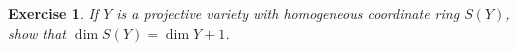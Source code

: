 \documentclass[12pt,letterpaper]{article}
\newtheorem{problem}{Exercise}[section]
\newtheorem{lemma}{Lemma}%
\theoremstyle{definition}
\theoremstyle{remark}
\numberwithin{equation}{section}
\numberwithin{figure}{problem}
\let\AA\relax
\DeclareMathOperator{\AA}{\mathbb{A}}
\newcommand{\PP}{\mathbb{P}}
\begin{document}
\begin{problem}\label{exc:2.6}
  If $Y$ is a projective variety with homogeneous coordinate ring $S(Y)$, show that $\dim S(Y) = \dim Y + 1$. 
\end{problem}
%  
\end{document}
